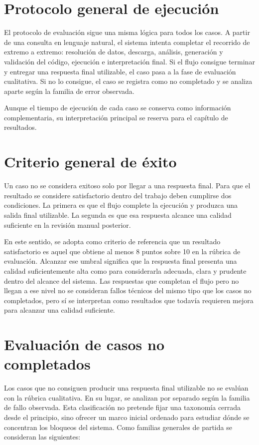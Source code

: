 \section{Protocolo general de ejecuci\'on}

El protocolo de evaluaci\'on sigue una misma l\'ogica para todos los casos. A partir de una consulta en lenguaje natural, el sistema intenta completar el
recorrido de extremo a extremo: resoluci\'on de datos, descarga, an\'alisis, generaci\'on y validaci\'on del c\'odigo, ejecuci\'on e interpretaci\'on final.
Si el flujo consigue terminar y entregar una respuesta final utilizable, el caso pasa a la fase de evaluaci\'on cualitativa. Si no lo consigue, el caso se
registra como no completado y se analiza aparte seg\'un la familia de error observada.

Aunque el tiempo de ejecuci\'on de cada caso se conserva como informaci\'on complementaria, su interpretaci\'on principal se reserva para el cap\'itulo de resultados.

\section{Criterio general de \'exito}

Un caso no se considera exitoso solo por llegar a una respuesta final. Para que el resultado se considere satisfactorio dentro del trabajo deben cumplirse dos
condiciones. La primera es que el flujo complete la ejecuci\'on y produzca una salida final utilizable. La segunda es que esa respuesta alcance una calidad
suficiente en la revisi\'on manual posterior.

En este sentido, se adopta como criterio de referencia que un resultado satisfactorio es aquel que obtiene al menos 8 puntos sobre 10 en la r\'ubrica de evaluaci\'on. 
Alcanzar ese umbral significa que la respuesta final presenta una calidad suficientemente alta como para considerarla adecuada, clara y prudente dentro del alcance 
del sistema. Las respuestas que completan el flujo pero no llegan a ese nivel no se consideran fallos t\'ecnicos del mismo tipo
que los casos no completados, pero s\'i se interpretan como resultados que todav\'ia requieren mejora para alcanzar una calidad suficiente.

\section{Evaluaci\'on de casos no completados}

Los casos que no consiguen producir una respuesta final utilizable no se eval\'uan con la r\'ubrica cualitativa. En su lugar, se analizan por separado seg\'un la 
familia de fallo observada. Esta clasificaci\'on no pretende fijar una taxonom\'ia cerrada desde el principio, sino ofrecer un marco inicial ordenado para estudiar
d\'onde se concentran los bloqueos del sistema. Como familias generales de partida se consideran las siguientes:

